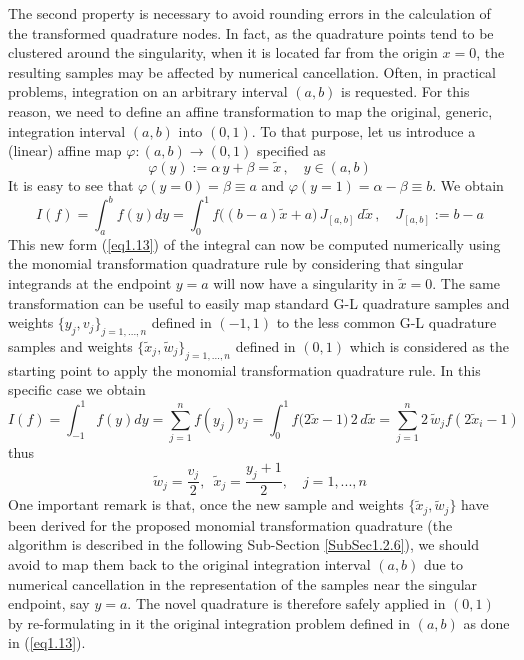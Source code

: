 \documentclass[a4paper, twosided]{book}
\begin{document}
\noindent
The second property is necessary to avoid rounding errors in the calculation of the transformed quadrature nodes. In fact, as the quadrature points tend to be clustered around the singularity, when it is located far from the origin $x=0$, the resulting samples may be affected by numerical cancellation. Often, in practical problems, integration on an arbitrary interval $(a,b)$ is requested. For this reason, we need to define an affine transformation to map the original, generic, integration interval $(a,b)$ into $(0,1)$. To that purpose, let us introduce a (linear) affine map $\varphi:(a,b)\to(0,1)$ specified as
\begin{equation}\label{eq1.12}
    \varphi(y) := \alpha\,y + \beta = \tilde{x}\,,\quad y\in(a,b)
\end{equation}
\noindent
It is easy to see that $\varphi(y=0)=\beta\equiv a$ and $\varphi(y=1)=\alpha-\beta\equiv b$. We obtain
\begin{equation}\label{eq1.13}
    I(f) = \int_a^b f(y) dy = \int_{0}^{1} f\Big(({b-a})\tilde{x}+a\Big)\,J_{[a,b]}\,d\tilde{x}\,,\quad J_{[a,b]}:=b-a
\end{equation}
\noindent
This new form (\ref{eq1.13}) of the integral can now be computed numerically using the monomial transformation quadrature rule by considering that singular integrands at the endpoint $y=a$ will now have a singularity in $\tilde{x}=0$. The same transformation can be useful to easily map standard G-L quadrature samples and weights $\{y_j, v_j\}_{j=1,...,n}$ defined in $(-1,1)$ to the less common G-L quadrature samples and weights $\{\tilde{x}_j,\tilde{w}_j\}_{j=1,...,n}$ defined in $(0,1)$ which is considered as the starting point to apply the monomial transformation quadrature rule. In this specific case we obtain
\begin{equation}\label{eq1.14}
    I(f) = \int_{-1}^1 f(y) dy =\sum_{j=1}^n f(y_j)v_j = \int_{0}^{1} f\Big(2\tilde{x}-1\Big)\,2\, d\tilde{x}=\sum_{j=1}^n 2\,\tilde{w}_j f(2 \tilde{x}_i-1)
\end{equation}
\noindent
thus
\begin{equation}\label{eq1.15}
    \tilde{w}_j=\frac{v_j}{2}, \;\: \tilde{x}_j=\frac{y_j+1}{2}, \quad j=1,...,n
\end{equation}
\noindent
One important remark is that, once the new sample and weights $\{\tilde{x}_j,\tilde{w}_j\}$ have been derived for the proposed monomial transformation quadrature (the algorithm is described in the following Sub-Section \ref{SubSec1.2.6}), we should avoid to map them back to the original integration interval $(a,b)$ due to numerical cancellation in the representation of the samples near the singular endpoint, say $y=a$. The novel quadrature is therefore safely applied in $(0,1)$ by re-formulating in it the original integration problem defined in $(a,b)$ as done in (\ref{eq1.13}).
\end{document}
